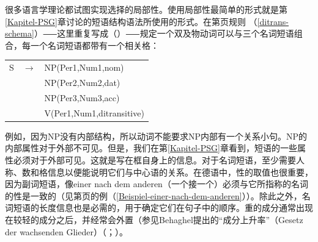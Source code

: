 很多语言学理论都试图实现选择的局部性。使用局部性最简单的形式就是第\ref{Kapitel-PSG}章讨论的短语结构语法所使用的形式。在第\pageref{ditrans-schema}页规则 （\ref{ditrans-schema}）⸺这里重复写成（）⸺规定一个双及物动词可以与三个名词短语组合，每一个名词短语都带有一个相关格：
\ea
\begin{tabular}[t]{@{}l@{ }l@{ }l}
S  & $\to$ & NP({Per1},{Num1},{nom}) \\
   &       & NP(Per2,Num2,{dat})\\
   &       & NP(Per3,Num3,{acc})\\
   &       & V({Per1},{Num1},ditransitive)\\
\end{tabular}
\z
例如，因为NP没有内部结构，所以动词不能要求NP内部有一个关系小句。NP的内部属性对于外部不可见。但是，我们在第\ref{Kapitel-PSG}章看到，短语的一些属性必须对于外部可见。这就是写在框自身上的信息。对于名词短语，至少需要人称、数和格信息以便能说明它们与中心语的关系。在德语中，性的取值也很重要，因为副词短语，像einer nach dem anderen（一个接一个）必须与它所指称的名词的性是一致的（见第\pageref{Beispiel-einer-nach-dem-anderen}页的例（\ref{Beispiel-einer-nach-dem-anderen}））。除此之外，名词短语的长度信息也是必需的，用于确定它们在句子中的顺序。重的成分通常出现在较轻的成分之后，并经常会外置（参见Behaghel提出的“成分上升率”（Gesetz der wachsenden Glieder）（\citeyear[]{Behaghel09}；\citeyear[]{Behaghel30}）。 

